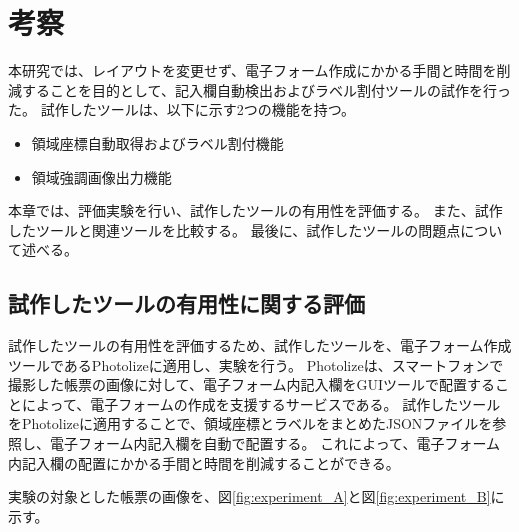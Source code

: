 \chapter{考察}\label{cha:Discussion}
本研究では、レイアウトを変更せず、電子フォーム作成にかかる手間と時間を削減することを目的として、記入欄自動検出およびラベル割付ツールの試作を行った。
試作したツールは、以下に示す2つの機能を持つ。

\begin{itemize}
  \item 領域座標自動取得およびラベル割付機能
  \item 領域強調画像出力機能
\end{itemize}

本章では、評価実験を行い、試作したツールの有用性を評価する。
また、試作したツールと関連ツールを比較する。
最後に、試作したツールの問題点について述べる。

\section{試作したツールの有用性に関する評価}\label{sec:evalue_usefulness}
試作したツールの有用性を評価するため、試作したツールを、電子フォーム作成ツールであるPhotolize\cite{Photolize}に適用し、実験を行う。
Photolizeは、スマートフォンで撮影した帳票の画像に対して、電子フォーム内記入欄をGUIツールで配置することによって、電子フォームの作成を支援するサービスである。
試作したツールをPhotolizeに適用することで、領域座標とラベルをまとめたJSONファイルを参照し、電子フォーム内記入欄を自動で配置する。
これによって、電子フォーム内記入欄の配置にかかる手間と時間を削減することができる。

実験の対象とした帳票の画像を、図\ref{fig:experiment_A}と図\ref{fig:experiment_B}に示す。

